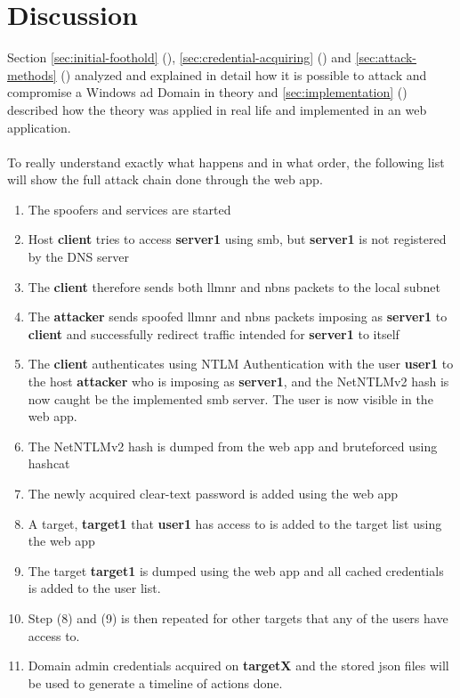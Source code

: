 \documentclass{article}
\begin{document}
\section{Discussion}
Section \ref{sec:initial-foothold} (), \ref{sec:credential-acquiring} () and \ref{sec:attack-methods} () analyzed and explained in detail how it is possible to attack and compromise a Windows \gls{ad} Domain in theory and \ref{sec:implementation} () described how the theory was applied in real life and implemented in an web application.
\\\\
To really understand exactly what happens and in what order, the following list will show the full attack chain done through the web app.

\begin{enumerate}
    \item The spoofers and services are started
    \item Host \textbf{client} tries to access \textbf{server1} using \gls{smb}, but \textbf{server1} is not registered by the DNS server
    \item The \textbf{client} therefore sends both \gls{llmnr} and \gls{nbns} packets to the local subnet
    \item The \textbf{attacker} sends spoofed \gls{llmnr} and \gls{nbns} packets imposing as \textbf{server1} to \textbf{client} and successfully redirect traffic intended for \textbf{server1} to itself
    \item The \textbf{client} authenticates using NTLM Authentication with the user \textbf{user1} to the host \textbf{attacker} who is imposing as \textbf{server1}, and the NetNTLMv2 hash is now caught be the implemented \gls{smb} server. The user is now visible in the web app.
    \item The NetNTLMv2 hash is dumped from the web app and bruteforced using hashcat
    \item The newly acquired clear-text password is added using the web app
    \item A target, \textbf{target1} that \textbf{user1} has access to is added to the target list using the web app
    \item The target \textbf{target1} is dumped using the web app and all cached credentials is added to the user list.
    \item Step (8) and (9) is then repeated for other targets that any of the users have access to.
    \item Domain admin credentials acquired on \textbf{targetX} and the stored \gls{json} files will be used to generate a timeline of actions done.
\end{enumerate}
\end{document}
